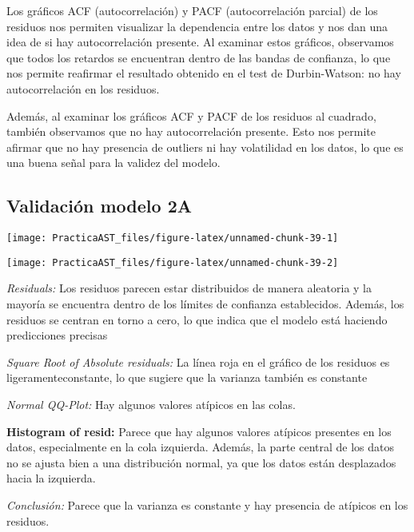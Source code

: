 \documentclass[
]{article}
\begin{document}
Los gráficos ACF (autocorrelación) y PACF (autocorrelación parcial) de
los residuos nos permiten visualizar la dependencia entre los datos y
nos dan una idea de si hay autocorrelación presente. Al examinar estos
gráficos, observamos que todos los retardos se encuentran dentro de las
bandas de confianza, lo que nos permite reafirmar el resultado obtenido
en el test de Durbin-Watson: no hay autocorrelación en los residuos.

Además, al examinar los gráficos ACF y PACF de los residuos al cuadrado,
también observamos que no hay autocorrelación presente. Esto nos permite
afirmar que no hay presencia de outliers ni hay volatilidad en los
datos, lo que es una buena señal para la validez del modelo.

\medskip

\hypertarget{validaciuxf3n-modelo-2a}{%
\subsection{Validación modelo 2A}\label{validaciuxf3n-modelo-2a}}

\begin{center}\texttt{[image: PracticaAST\_files/figure-latex/unnamed-chunk-39-1]} \end{center}

\begin{center}\texttt{[image: PracticaAST\_files/figure-latex/unnamed-chunk-39-2]} \end{center}

\emph{Residuals:} Los residuos parecen estar distribuidos de manera
aleatoria y la mayoría se encuentra dentro de los límites de confianza
establecidos. Además, los residuos se centran en torno a cero, lo que
indica que el modelo está haciendo predicciones precisas

\emph{Square Root of Absolute residuals:} La línea roja en el gráfico de
los residuos es ligeramenteconstante, lo que sugiere que la varianza
también es constante

\emph{Normal QQ-Plot:} Hay algunos valores atípicos en las colas.

\textbf{Histogram of resid:} Parece que hay algunos valores atípicos
presentes en los datos, especialmente en la cola izquierda. Además, la
parte central de los datos no se ajusta bien a una distribución normal,
ya que los datos están desplazados hacia la izquierda.

\emph{Conclusión:} Parece que la varianza es constante y hay presencia
de atípicos en los residuos.
\end{document}

